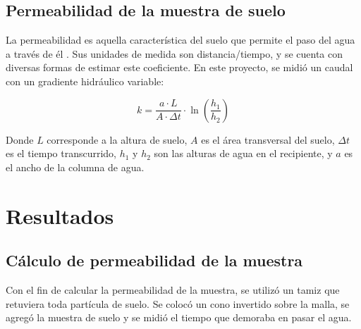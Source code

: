 \subsection{Permeabilidad de la muestra de suelo}

La permeabilidad es aquella característica del suelo que permite el paso del agua a través de él \citep{permeabilidad_suelos}. Sus unidades de medida son distancia/tiempo, y se cuenta con diversas formas de estimar este coeficiente. En este proyecto, se midió un caudal con un gradiente hidráulico variable:

\begin{equation}
    k = \frac{a \cdot L}{A \cdot \Delta t} \cdot \ln\left(\frac{h_1}{h_2}\right)
\end{equation}

Donde \(L\) corresponde a la altura de suelo, \(A\) es el área transversal del suelo, \(\Delta t\) es el tiempo transcurrido, \(h_1\) y \(h_2\) son las alturas de agua en el recipiente, y \(a\) es el ancho de la columna de agua.

\newpage
\section{Resultados}

\subsection{Cálculo de permeabilidad de la muestra}

Con el fin de calcular la permeabilidad de la muestra, se utilizó un tamiz que retuviera toda partícula de suelo. Se colocó un cono invertido sobre la malla, se agregó la muestra de suelo y se midió el tiempo que demoraba en pasar el agua.

